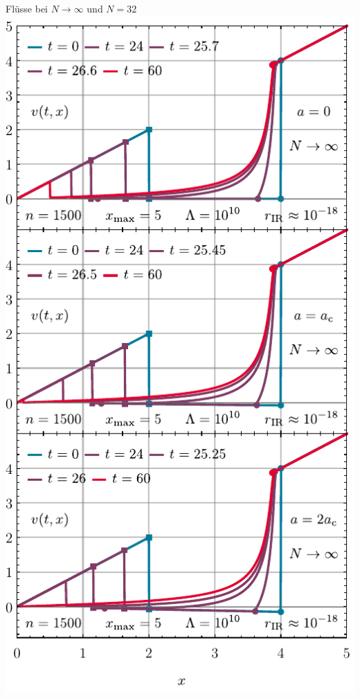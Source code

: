 \begin{frame}{Flüsse bei $N\rightarrow\infty$ und $N=32$}
	\label{0dlargeN}
	\centering
	\includegraphics[width=0.36\framewidth]{../0d/figures/largeN_flows.pdf}\hspace{.5cm}

\end{frame}
